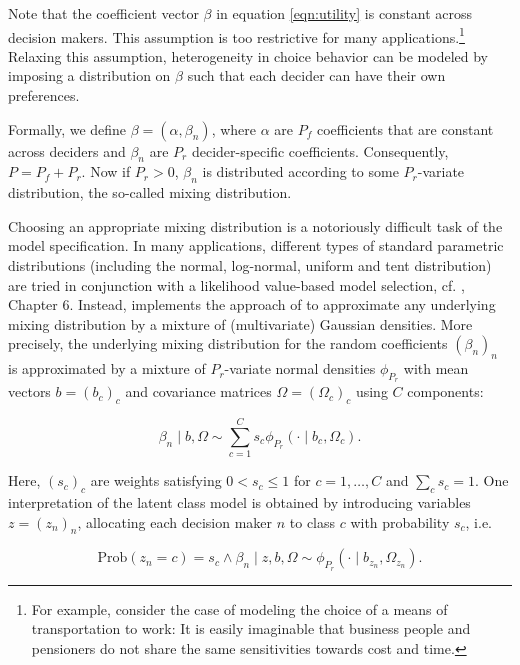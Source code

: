 \documentclass[article]{jss}
\begin{document}
Note that the coefficient vector $\beta$ in equation \ref{eqn:utility} is constant across decision makers. This assumption is too restrictive for many applications.\footnote{For example, consider the case of modeling the choice of a means of transportation to work: It is easily imaginable that business people and pensioners do not share the same sensitivities towards cost and time.} Relaxing this assumption, heterogeneity in choice behavior can be modeled by imposing a distribution on $\beta$ such that each decider can have their own preferences.

Formally, we define $\beta = (\alpha, \beta_n)$, where $\alpha$ are $P_f$ coefficients that are constant across deciders and $\beta_n$ are $P_r$ decider-specific coefficients. Consequently, $P = P_f + P_r$. Now if $P_r>0$, $\beta_n$ is distributed according to some $P_r$-variate distribution, the so-called mixing distribution.

Choosing an appropriate mixing distribution is a notoriously difficult task of the model specification. In many applications, different types of standard parametric distributions (including the normal, log-normal, uniform and tent distribution) are tried in conjunction with a likelihood value-based model selection, cf. \cite{Train:2009}, Chapter 6. Instead,  implements the approach of \cite{Oelschlaeger:2020} to approximate any underlying mixing distribution by a mixture of (multivariate) Gaussian densities. More precisely, the underlying mixing distribution for the random coefficients $(\beta_n)_{n}$ is approximated by a mixture of $P_r$-variate normal densities $\phi_{P_r}$ with mean vectors $b=(b_c)_{c}$ and covariance matrices $\Omega=(\Omega_c)_{c}$ using $C$ components:

\begin{equation}
\beta_n\mid b,\Omega \sim \sum_{c=1}^{C} s_c \phi_{P_r} (\cdot \mid b_c,\Omega_c).
\end{equation}

Here, $(s_c)_{c}$ are weights satisfying $0 < s_c\leq 1$ for $c=1,\dots,C$ and $\sum_c s_c=1$. One interpretation of the latent class model is obtained by introducing variables $z=(z_n)_n$, allocating each decision maker $n$ to class $c$ with probability $s_c$, i.e.

\begin{equation}
\text{Prob}(z_n=c)=s_c \land \beta_n \mid z,b,\Omega \sim \phi_{P_r}(\cdot \mid b_{z_n},\Omega_{z_n}).
\end{equation}
\end{document}
